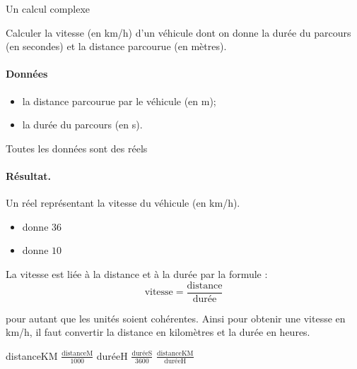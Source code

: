 \begin{Fiche}{Un calcul complexe}
\label{fiche:calcul-complexe}

	Calculer la vitesse (en km/h) d'un véhicule dont on donne
	la durée du parcours (en secondes) 
	et la distance parcourue (en mètres).


	\paragraph{Données}
	\begin{itemize}
	\item la distance parcourue par le véhicule (en m);
	\item la durée du parcours (en s).
	\end{itemize}
	Toutes les données sont des réels

	\paragraph{Résultat.}
	Un réel représentant la vitesse du véhicule (en km/h).

	\bigskip
	\begin{center}	
	\end{center}


	\begin{itemize}
	\item {} donne $36$
	\item {} donne $10$
	\end{itemize}


	La vitesse est liée à la distance et à la durée par la formule :
	\begin{equation}
		\textrm{vitesse} = \frac{\textrm{distance}}{\textrm{durée}}
	\end{equation}

	pour autant que les unités soient cohérentes.
	Ainsi pour obtenir une vitesse en km/h, 
	il faut convertir la distance en kilomètres 
	et la durée en heures.
		

	\begin{LDA}
		\Let distanceKM \Gets $\frac{\textrm{distanceM}}{1000}$
		\Let duréeH \Gets $\frac{\textrm{duréeS}}{3600}$
		\Return $\frac{\textrm{distanceKM}}{\textrm{duréeH}}$
	\EndAlgo
	\end{LDA}


\end{Fiche}
